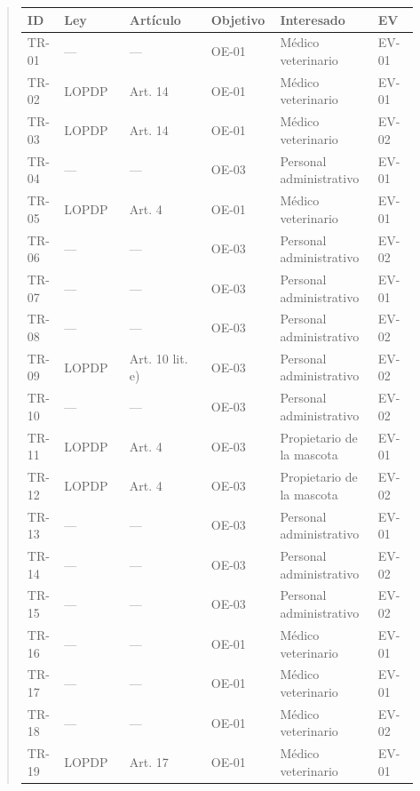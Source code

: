 \documentclass[
]{article}
\newcounter{none} %
\begin{document}
\begin{quote}
{\footnotesize
\def\LTcaptype{none}
\begin{longtable}[]{|
  >{\raggedright\arraybackslash}p{0.09\linewidth}|
  >{\raggedright\arraybackslash}p{0.16\linewidth}|
  >{\raggedright\arraybackslash}p{0.20\linewidth}|
  >{\raggedright\arraybackslash}p{0.16\linewidth}|
  >{\raggedright\arraybackslash}p{0.24\linewidth}|
  >{\raggedright\arraybackslash}p{0.10\linewidth}|}
\hline
\textbf{ID} & \textbf{Ley} & \textbf{Artículo} & \textbf{Objetivo} & \textbf{Interesado} & \textbf{EV} \\
\hline
\endhead
\hline
\endlastfoot
TR-01 & — & — & OE-01 & Médico veterinario & EV-01 \\
\hline
TR-02 & LOPDP & Art. 14 & OE-01 & Médico veterinario & EV-01 \\
\hline
TR-03 & LOPDP & Art. 14 & OE-01 & Médico veterinario & EV-02 \\
\hline
TR-04 & — & — & OE-03 & Personal administrativo & EV-01 \\
\hline
TR-05 & LOPDP & Art. 4 & OE-01 & Médico veterinario & EV-01 \\
\hline
TR-06 & — & — & OE-03 & Personal administrativo & EV-02 \\
\hline
TR-07 & — & — & OE-03 & Personal administrativo & EV-01 \\
\hline
TR-08 & — & — & OE-03 & Personal administrativo & EV-02 \\
\hline
TR-09 & LOPDP & Art. 10 lit. e) & OE-03 & Personal administrativo & EV-02 \\
\hline
TR-10 & — & — & OE-03 & Personal administrativo & EV-02 \\
\hline
TR-11 & LOPDP & Art. 4 & OE-03 & Propietario de la mascota & EV-01 \\
\hline
TR-12 & LOPDP & Art. 4 & OE-03 & Propietario de la mascota & EV-02 \\
\hline
TR-13 & — & — & OE-03 & Personal administrativo & EV-01 \\
\hline
TR-14 & — & — & OE-03 & Personal administrativo & EV-02 \\
\hline
TR-15 & — & — & OE-03 & Personal administrativo & EV-02 \\
\hline
TR-16 & — & — & OE-01 & Médico veterinario & EV-01 \\
\hline
TR-17 & — & — & OE-01 & Médico veterinario & EV-01 \\
\hline
TR-18 & — & — & OE-01 & Médico veterinario & EV-02 \\
\hline
TR-19 & LOPDP & Art. 17 & OE-01 & Médico veterinario & EV-01 \\

\end{longtable}}
\end{quote}
\end{document}
